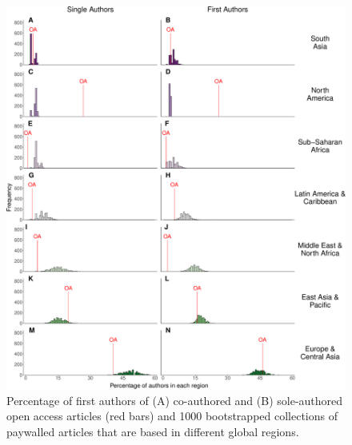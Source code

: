 \documentclass[english,man]{apa6}
\begin{document}
\begin{figure}

{\centering \includegraphics{Smith_etal_APC_ms_files/figure-latex/Fig5-1} 

}

\caption{Percentage of first authors of (A) co-authored and (B) sole-authored open access articles (red bars) and 1000 bootstrapped collections of paywalled articles that are based in different global regions.}\label{fig:Fig5}
\end{figure}
\end{document}
